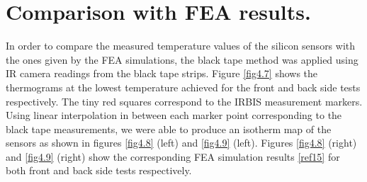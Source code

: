 	\section{Comparison with FEA results.}\label{section4.4}	
	
		In order to compare the measured temperature values of the silicon sensors with the ones given by the FEA simulations, the black tape method was applied using IR camera readings from the black tape strips. Figure \ref{fig4.7} shows the thermograms at the lowest temperature achieved for the front and back side tests respectively. The tiny red squares correspond to the IRBIS measurement markers. Using linear interpolation in between each marker point corresponding to the black tape measurements, we were able to produce an isotherm map of the sensors as shown in figures \ref{fig4.8} (left) and \ref{fig4.9} (left). Figures \ref{fig4.8} (right) and \ref{fig4.9} (right) show the corresponding FEA simulation results \ref{ref15} for both front and back side tests respectively.
		
